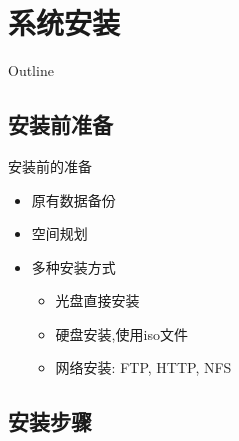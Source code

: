 
\section{系统安装}
\begin{frame}[shrink]{Outline}
	\tableofcontents[currentsection]
\end{frame}



\subsection{安装前准备}

\begin{frame}{安装前的准备}
\begin{itemize}
\item 原有数据备份
\item 空间规划
\item 多种安装方式

	\begin{itemize}
	\item 光盘直接安装
	\item 硬盘安装,使用iso文件
	\item 网络安装: FTP, HTTP, NFS
	\end{itemize}
\end{itemize}

\end{frame}

\subsection{安装步骤}

